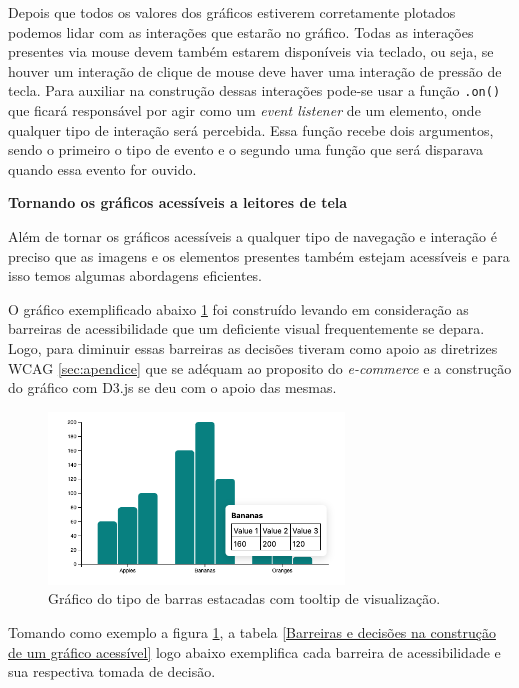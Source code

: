 {Depois que todos os valores dos gráficos estiverem corretamente plotados podemos lidar com as interações que estarão no gráfico. Todas as interações presentes via mouse devem também estarem disponíveis via teclado, ou seja, se houver um interação de clique de mouse deve haver uma interação de pressão de tecla. Para auxiliar na construção dessas interações pode-se usar a função \lstinline{.on()} que ficará responsável por agir como um \textit{event listener} de um elemento, onde qualquer tipo de interação será percebida. Essa função recebe dois argumentos, sendo o primeiro o tipo de evento e o segundo uma função que será disparava quando essa evento for ouvido. 

\vspace*{50px}
\textbf{Tornando os gráficos acessíveis a leitores de tela}

{Além de tornar os gráficos acessíveis a qualquer tipo de navegação e interação é preciso que as imagens e os elementos presentes também estejam acessíveis e para isso temos algumas abordagens eficientes. 

O gráfico exemplificado abaixo \ref{fig:grafico-d3} foi construído levando em consideração as barreiras de acessibilidade que um deficiente visual frequentemente se depara. Logo, para diminuir essas barreiras as decisões tiveram como apoio as diretrizes WCAG \ref{sec:apendice} que se adéquam ao proposito do \textit{e-commerce} e a construção do gráfico com D3.js \cite{D3} se deu com o apoio das mesmas. 


\begin{figure}[ht]
  	\center
    \includegraphics[width=0.7\textwidth]{images/barchart-tooltip.png}
    \caption{Gráfico do tipo de barras estacadas com tooltip de visualização.}
    \label{fig:grafico-d3}
\end{figure} 

}

\newpage
{

{Tomando como exemplo a figura \ref{fig:grafico-d3}, a tabela \ref{Barreiras e decisões na construção de um gráfico acessível} logo abaixo exemplifica cada barreira de acessibilidade e sua respectiva tomada de decisão.}
\vspace*{20px}

}}

